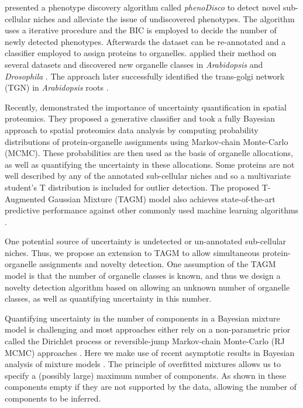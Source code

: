 \documentclass[12pt,english]{article}
\begin{document}
 \cite{Breckels:2013} presented a phenotype discovery algorithm called \textit{phenoDisco} to detect novel sub-cellular niches and alleviate the issue of undiscovered phenotypes. The algorithm uses a iterative procedure and the BIC \citep{Schwarz::1978} is employed to decide the number of newly detected phenotypes. Afterwards the dataset can be re-annotated and a classifier employed to assign proteins to organelles. \cite{Breckels:2013} applied their method on several datasets and discovered new organelle classes in \textit{Arabidopsis} \citep{Dunkley:2006} and \textit{Drosophila} \citep{Tan:2009}. The approach later successfully identified the trans-golgi network (TGN) in \textit{Arabidopsis} roots \citep{Groen:2014}.

Recently, \cite{Crook:2018} demonstrated the importance of uncertainty quantification in spatial proteomics. They proposed a generative classifier and took a fully Bayesian approach to spatial proteomics data analysis by computing probability distributions of protein-organelle assignments using Markov-chain Monte-Carlo (MCMC). These probabilities are then used as the basis of organelle allocations, as well as quantifying the uncertainty in these allocations. Some proteins are not well described by any of the annotated sub-cellular niches and so a multivariate student's T distribution is included for outlier detection. The proposed T-Augmented Gaussian Mixture (TAGM) model also achieves state-of-the-art predictive performance against other commonly used machine learning algorithms \citep{Crook:2018}. 

One potential source of uncertainty is undetected or un-annotated sub-cellular niches. Thus, we propose an extension to TAGM to allow simultaneous protein-organelle assignments and novelty detection. One assumption of the TAGM model is that the number of organelle classes is known, and thus we design a novelty detection algorithm based on allowing an unknown number of organelle classes, as well as quantifying uncertainty in this number.

Quantifying uncertainty in the number of components in a Bayesian mixture model is challenging and most approaches either rely on a non-parametric prior called the Dirichlet process \citep{ferguson::1974, antoniak::1974} or reversible-jump Markov-chain Monte-Carlo (RJ MCMC) approaches \citep{Richardson::1997}. Here we make use of recent asymptotic results in Bayesian analysis of mixture models \citep{Rousseau::2011}. The principle of overfitted mixtures allows us to specify a (possibly large) maximum number of components. As shown in \cite{Rousseau::2011} these components empty if they are not supported by the data, allowing the number of components to be inferred.
\end{document}
